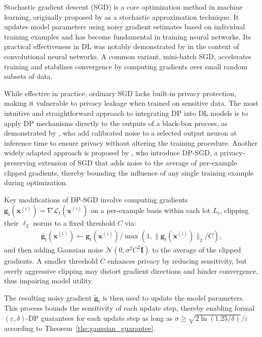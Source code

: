 Stochastic gradient descent (SGD) is a core optimization method in machine learning, originally proposed by \citet{robbins1951stochastic} as a stochastic approximation technique. It updates model parameters using noisy gradient estimates based on individual training examples and has become fundamental in training neural networks. Its practical effectiveness in DL was notably demonstrated by \citet{lecun1998gradient} in the context of convolutional neural networks. A common variant, mini-batch SGD, accelerates training and stabilizes convergence by computing gradients over small random subsets of data.

While effective in practice, ordinary SGD lacks built-in privacy protection, making it vulnerable to privacy leakage when trained on sensitive data. The most intuitive and straightforward approach to integrating DP into DL models is to apply DP mechanisms directly to the outputs of a black-box process, as demonstrated by \cite{lu2022differentially}, who add calibrated noise to a selected output neuron at inference time to ensure privacy without altering the training procedure. Another widely adapted approach is proposed by \citet{abadi2016deep}, who introduce DP-SGD, a privacy-preserving extension of SGD that adds noise to the average of per-example clipped gradients, thereby bounding the influence of any single training example during optimization.

Key modifications of DP-SGD involve computing gradients $\mathbf{g}_t(\mathbf{x}^{(i)}) = \nabla \mathcal{L}_t(\mathbf{x}^{(i)})$ on a per-example basis within each lot $L_t$, clipping their $\ell_2$ norms to a fixed threshold $C$ via:
\begin{align} \label{eq:grad_clip}
    \bar{\mathbf{g}}_t(\mathbf{x}^{(i)}) \leftarrow \mathbf{g}_t(\mathbf{x}^{(i)}) / \max(1, \|\mathbf{g}_t(\mathbf{x}^{(i)})\|_2 / C),
\end{align}
and then adding Gaussian noise $\mathcal{N}(0, \sigma^2 C^2 \mathbf{I})$ to the average of the clipped gradients. A smaller threshold \(C\) enhances privacy by reducing sensitivity, but overly aggressive clipping may distort gradient directions and hinder convergence, thus impairing model utility. 

The resulting noisy gradient $\tilde{\mathbf{g}}_t$ is then used to update the model parameters. This process bounds the sensitivity of each update step, thereby enabling formal $(\varepsilon, \delta)$-DP guarantees for each update step as long as \(\sigma \geq \sqrt{2 \ln \left( 1.25/\delta \right)}/\varepsilon\) according to Theorem~\ref{the:gaussian_guarantee}.

